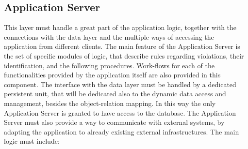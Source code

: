 \subsection{Application Server}
This layer must handle a great part of the application logic, together with the connections with the data layer and the 
multiple ways of accessing the application from different clients. The main feature of the Application Server is the set 
of specific modules of logic, that describe rules regarding violations, their identification, and the following procedures. 
Work-flows for each of the functionalities provided by the application itself are also provided in this component. 
\newline The interface with the data layer must be handled by a dedicated persistent unit, that will be dedicated also to 
the dynamic data access and management, besides the object-relation mapping. In this way the only Application Server is 
granted to have access to the database.
\newline The Application Server must also provide a way to communicate with external systems, by adapting the application 
to already existing external infrastructures. 
\newline The main logic must include:
